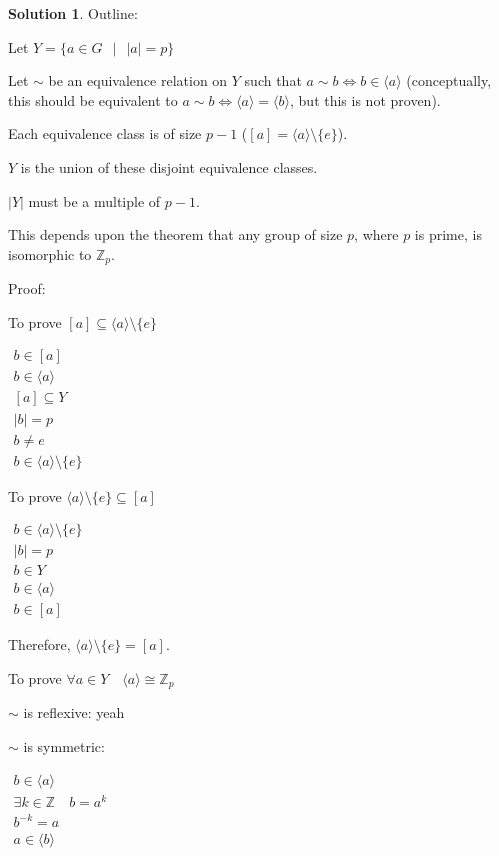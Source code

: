 \documentclass[12pt]{article}
\theoremstyle{definition}
\newtheorem*{soln}{Solution}
\newcommand{\ZZ}{{\mathbb{Z}}}
\begin{document}
\begin{soln}\quad

Outline:

Let $Y=\{a\in G\ \ \mid\ \ |a|=p\}$

Let $\sim$ be an equivalence relation on $Y$ such that
$a\sim b\Leftrightarrow b\in\langle a\rangle$
(conceptually, this should be equivalent to
$a\sim b\Leftrightarrow \langle a\rangle=\langle b\rangle$,
but this is not proven).

Each equivalence class is of size $p-1$ ($[a]=\langle a\rangle\setminus\{e\}$).

$Y$ is the union of these disjoint equivalence classes.

$|Y|$ must be a multiple of $p-1$.

This depends upon the theorem that any group of size $p$,
where $p$ is prime, is isomorphic to $\ZZ_p$.

Proof:

To prove $[a]\subseteq\langle a\rangle\setminus\{e\}$

$\begin{gathered}
b\in [a]\\
b\in \langle a\rangle\\
[a]\subseteq Y\\
|b|=p\\
b\neq e\\
b\in \langle a\rangle\setminus\{e\}
\end{gathered}$

To prove $\langle a\rangle\setminus\{e\}\subseteq[a]$

$\begin{gathered}
b\in\langle a\rangle\setminus\{e\}\\
|b|=p\\
b\in Y\\
b\in\langle a\rangle\\
b\in[a]
\end{gathered}$

Therefore, $\langle a\rangle\setminus\{e\}=[a]$.

To prove $\forall a\in Y\quad \langle a\rangle\cong\ZZ_p$

$\sim$ is reflexive: yeah

$\sim$ is symmetric:

$\begin{gathered}
b\in \langle a\rangle\\
\exists k\in\ZZ\quad b=a^k\\
b^{-k}=a\\
a\in \langle b\rangle
\end{gathered}$


\end{soln}
\end{document}
